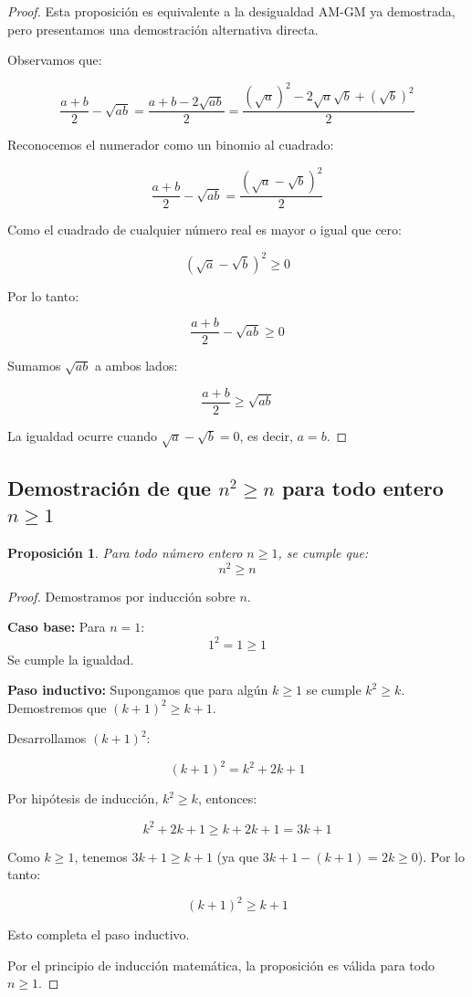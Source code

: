 \documentclass[12pt,final]{report}
\theoremstyle{plain}
\newtheorem{proposition}[theorem]{Proposición}
\theoremstyle{definition}
\begin{document}
\begin{proof}

Esta proposición es equivalente a la desigualdad AM-GM ya demostrada, pero presentamos una demostración alternativa directa.

Observamos que:

\[
\frac{a+b}{2} - \sqrt{ab} = \frac{a+b - 2\sqrt{ab}}{2} = \frac{(\sqrt{a})^2 - 2\sqrt{a}\sqrt{b} + (\sqrt{b})^2}{2}
\]

Reconocemos el numerador como un binomio al cuadrado:

\[
\frac{a+b}{2} - \sqrt{ab} = \frac{(\sqrt{a} - \sqrt{b})^2}{2}
\]

Como el cuadrado de cualquier número real es mayor o igual que cero:

\[
(\sqrt{a} - \sqrt{b})^2 \geq 0
\]

Por lo tanto:

\[
\frac{a+b}{2} - \sqrt{ab} \geq 0
\]

Sumamos $\sqrt{ab}$ a ambos lados:

\[
\frac{a+b}{2} \geq \sqrt{ab}
\]

La igualdad ocurre cuando $\sqrt{a} - \sqrt{b} = 0$, es decir, $a = b$.

\end{proof}

\newpage

\subsection{Demostración de que $n^2 \geq n$ para todo entero $n \geq 1$}

\begin{proposition}
Para todo número entero $n \geq 1$, se cumple que:
\[
n^2 \geq n
\]
\end{proposition}

\begin{proof}

Demostramos por inducción sobre $n$.

\textbf{Caso base:} Para $n = 1$:
\[
1^2 = 1 \geq 1
\]
Se cumple la igualdad.

\textbf{Paso inductivo:} Supongamos que para algún $k \geq 1$ se cumple $k^2 \geq k$. Demostremos que $(k+1)^2 \geq k+1$.

Desarrollamos $(k+1)^2$:

\[
(k+1)^2 = k^2 + 2k + 1
\]

Por hipótesis de inducción, $k^2 \geq k$, entonces:

\[
k^2 + 2k + 1 \geq k + 2k + 1 = 3k + 1
\]

Como $k \geq 1$, tenemos $3k + 1 \geq k + 1$ (ya que $3k + 1 - (k+1) = 2k \geq 0$). Por lo tanto:

\[
(k+1)^2 \geq k + 1
\]

Esto completa el paso inductivo.

Por el principio de inducción matemática, la proposición es válida para todo $n \geq 1$.

\end{proof}
\end{document}
